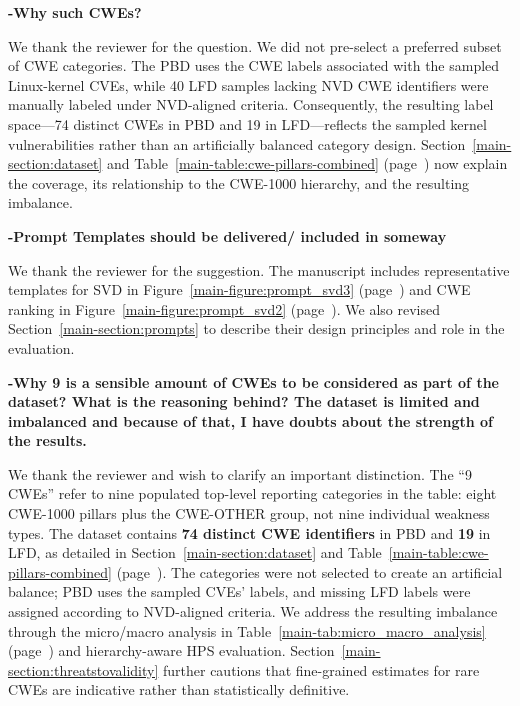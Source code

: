 \documentclass[journal,onecolumn]{IEEEtran}
\begin{document}
\textbf{-Why such CWEs?}

We thank the reviewer for the question. We did not pre-select a preferred subset of CWE categories. The PBD uses the CWE labels associated with the sampled Linux-kernel CVEs, while 40 LFD samples lacking NVD CWE identifiers were manually labeled under NVD-aligned criteria. Consequently, the resulting label space---74 distinct CWEs in PBD and 19 in LFD---reflects the sampled kernel vulnerabilities rather than an artificially balanced category design. Section~\ref{main-section:dataset} and Table~\ref{main-table:cwe-pillars-combined} (page~\pageref{main-table:cwe-pillars-combined}) now explain the coverage, its relationship to the CWE-1000 hierarchy, and the resulting imbalance.

\textbf{-Prompt Templates should be delivered/ included in someway}

We thank the reviewer for the suggestion. The manuscript includes representative templates for SVD in Figure~\ref{main-figure:prompt_svd3} (page~\pageref{main-figure:prompt_svd3}) and CWE ranking in Figure~\ref{main-figure:prompt_svd2} (page~\pageref{main-figure:prompt_svd2}). We also revised Section~\ref{main-section:prompts} to describe their design principles and role in the evaluation.

\textbf{-Why 9 is a sensible amount of CWEs to be considered as part of the dataset? What is the reasoning behind? The dataset is limited and imbalanced and because of that, I have doubts about the strength of the results.}

We thank the reviewer and wish to clarify an important distinction. The ``9 CWEs'' refer to nine populated top-level reporting categories in the table: eight CWE-1000 pillars plus the CWE-OTHER group, not nine individual weakness types. The dataset contains \textbf{74 distinct CWE identifiers} in PBD and \textbf{19} in LFD, as detailed in Section~\ref{main-section:dataset} and Table~\ref{main-table:cwe-pillars-combined} (page~\pageref{main-table:cwe-pillars-combined}). The categories were not selected to create an artificial balance; PBD uses the sampled CVEs' labels, and missing LFD labels were assigned according to NVD-aligned criteria. We address the resulting imbalance through the micro/macro analysis in Table~\ref{main-tab:micro_macro_analysis} (page~\pageref{main-tab:micro_macro_analysis}) and hierarchy-aware HPS evaluation. Section~\ref{main-section:threatstovalidity} further cautions that fine-grained estimates for rare CWEs are indicative rather than statistically definitive.
\end{document}
